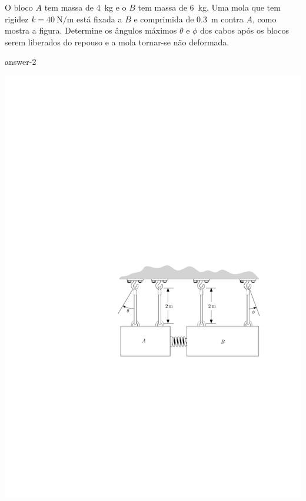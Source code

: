 \item O bloco $A$ tem massa de \SI{4}{\kilogram} e o $B$ tem massa de \SI{6}{\kilogram}. Uma mola que tem rigidez $k=\SI{40}{\newton/\meter}$ está
fixada a $B$ e comprimida de \SI{.3}{\meter} contra $A$, como mostra a figura. Determine os ângulos máximos $\theta$ e $\phi$ dos cabos após os blocos serem liberados do repouso e a mola tornar-se não deformada.

{answer-2}

\vspace{-1.8cm}
\begin{flushright}
	\includegraphics[scale=1.2]{images/draw_2}
\end{flushright}
